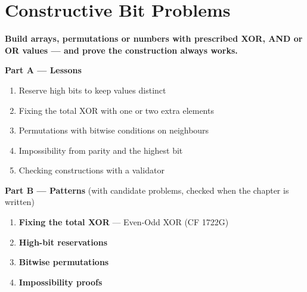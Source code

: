 \chapter{Constructive Bit Problems}
\label{ch:constructive}

\begin{tcolorbox}[enhanced, colback=white, colframe=secondaryblue, boxrule=1pt, arc=2mm]
\textbf{\large\textcolor{primaryblue}{Build arrays, permutations or numbers with prescribed XOR, AND or OR values --- and prove the construction always works.}}
\end{tcolorbox}


\begin{plannedbox}
\textbf{Part A --- Lessons}
\begin{enumerate}[leftmargin=*, label=\textbf{A\arabic*.}, itemsep=1pt]
    \item Reserve high bits to keep values distinct
    \item Fixing the total XOR with one or two extra elements
    \item Permutations with bitwise conditions on neighbours
    \item Impossibility from parity and the highest bit
    \item Checking constructions with a validator
\end{enumerate}
\textbf{Part B --- Patterns} (with candidate problems, checked when the chapter is written)
\begin{enumerate}[leftmargin=*, label=\textbf{P\arabic*.}, itemsep=1pt]
    \item \textbf{Fixing the total XOR} --- Even-Odd XOR {\small\color{darkgray}(CF 1722G)}
    \item \textbf{High-bit reservations}
    \item \textbf{Bitwise permutations}
    \item \textbf{Impossibility proofs}
\end{enumerate}
\end{plannedbox}
